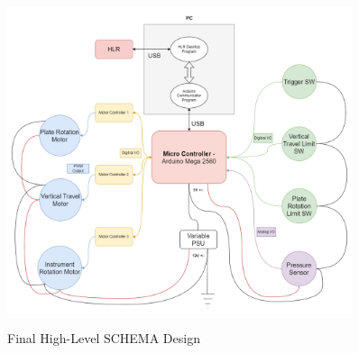 \documentclass{UoNMCHA}
\numberwithin{equation}{section}
\begin{document}
\begin{figure}[h]
	\centering
	\includegraphics[width=0.9\textwidth]{SystemSchemaSimplifiedFinal.png}\label{fig:High Level SCHEMA Design}
	\caption{Final High-Level SCHEMA Design}
	\label{fig:High-Level SCHEMA Design}
\end{figure}
\end{document}
